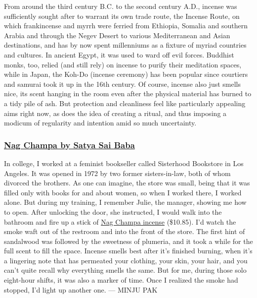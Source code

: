 From around the third century B.C. to the second century A.D., incense
was sufficiently sought after to warrant its own trade route, the
Incense Route, on which frankincense and myrrh were ferried from
Ethiopia, Somalia and southern Arabia and through the Negev Desert to
various Mediterranean and Asian destinations, and has by now spent
millenniums as a fixture of myriad countries and cultures. In ancient
Egypt, it was used to ward off evil forces. Buddhist monks, too, relied
(and still rely) on incense to purify their meditation spaces, while in
Japan, the Koh-Do (incense ceremony) has been popular since courtiers
and samurai took it up in the 16th century. Of course, incense also just
smells nice, its scent hanging in the room even after the physical
material has burned to a tidy pile of ash. But protection and
cleanliness feel like particularly appealing aims right now, as does the
idea of creating a ritual, and thus imposing a modicum of regularity and
intention amid so much uncertainty.

\hypertarget{nag-champa-by-satya-sai-baba}{%
\subsubsection{\texorpdfstring{\textbf{\href{https://www.iherb.com/pr/Sai-Baba-Satya-Nag-Champa-Agarbatti-Incense-Sticks-100-g/37611?gclid=EAIaIQobChMIpfLruoXG6QIVTLLICh2AEwCkEAQYAiABEgIdYvD_BwE\&gclsrc=aw.ds}{Nag
Champa by Satya Sai
Baba}}}{Nag Champa by Satya Sai Baba}}\label{nag-champa-by-satya-sai-baba}}

In college, I worked at a feminist bookseller called Sisterhood
Bookstore in Los Angeles. It was opened in 1972 by two former
sisters-in-law, both of whom divorced the brothers. As one can imagine,
the store was small, being that it was filled only with books for and
about women, so when I worked there, I worked alone. But during my
training, I remember Julie, the manager, showing me how to open. After
unlocking the door, she instructed, I would walk into the bathroom and
fire up a stick of
\href{https://www.iherb.com/pr/Sai-Baba-Satya-Nag-Champa-Agarbatti-Incense-Sticks-100-g/37611?gclid=EAIaIQobChMIpfLruoXG6QIVTLLICh2AEwCkEAQYAiABEgIdYvD_BwE\&gclsrc=aw.ds}{Nag
Champa incense} (\$10.85). I'd watch the smoke waft out of the restroom
and into the front of the store. The first hint of sandalwood was
followed by the sweetness of plumeria, and it took a while for the full
scent to fill the space. Incense smells best after it's finished
burning, when it's a lingering note that has permeated your clothing,
your skin, your hair, and you can't quite recall why everything smells
the same. But for me, during those solo eight-hour shifts, it was also a
marker of time. Once I realized the smoke had stopped, I'd light up
another one. --- MINJU PAK

